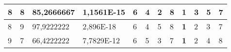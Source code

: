 \documentclass[conference]{IEEEtran}
\begin{document}
\begin{table*}[]
\begin{tabular}{|llll|llllllll|}
\multicolumn{1}{|l|}{8}                                                     & \multicolumn{1}{l|}{8}                                                        & \multicolumn{1}{l|}{85,2666667}                                                   & 1,1561E-15                     & \multicolumn{1}{l|}{6}                                                  & \multicolumn{1}{l|}{4}                                                  & \multicolumn{1}{l|}{2}                                                  & \multicolumn{1}{l|}{8}                                                  & \multicolumn{1}{l|}{\textbf{1}}                                         & \multicolumn{1}{l|}{3}                                                  & \multicolumn{1}{l|}{5}                                                  & 7                          \\ \hline
\multicolumn{1}{|l|}{8}                                                     & \multicolumn{1}{l|}{9}                                                        & \multicolumn{1}{l|}{97,9222222}                                                   & 2,896E-18                      & \multicolumn{1}{l|}{6}                                                  & \multicolumn{1}{l|}{4}                                                  & \multicolumn{1}{l|}{5}                                                  & \multicolumn{1}{l|}{8}                                                  & \multicolumn{1}{l|}{\textbf{1}}                                         & \multicolumn{1}{l|}{2}                                                  & \multicolumn{1}{l|}{3}                                                  & 7                          \\ \hline
\multicolumn{1}{|l|}{9}                                                     & \multicolumn{1}{l|}{7}                                                        & \multicolumn{1}{l|}{66,4222222}                                                   & 7,7829E-12                     & \multicolumn{1}{l|}{6}                                                  & \multicolumn{1}{l|}{5}                                                  & \multicolumn{1}{l|}{3}                                                  & \multicolumn{1}{l|}{7}                                                  & \multicolumn{1}{l|}{\textbf{1}}                                         & \multicolumn{1}{l|}{2}                                                  & \multicolumn{1}{l|}{4}                                                  & 8                          \\ \hline

\end{tabular}
\end{table*}
\end{document}

